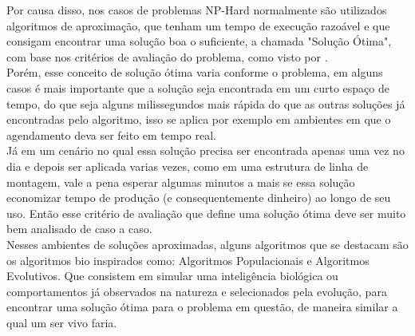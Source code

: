         Por causa disso, nos casos de problemas NP-Hard normalmente são utilizados algoritmos de aproximação, que tenham um tempo de execução razoável e que consigam encontrar uma solução boa o suficiente, a chamada "Solução Ótima",  com base nos critérios de avaliação do problema, como visto por \cite{lawler1993}.\\
        Porém, esse conceito de solução ótima varia conforme o problema, em alguns casos é mais importante que a solução seja encontrada em um curto espaço de tempo, do que seja alguns milissegundos mais rápida do que as outras soluções já encontradas pelo algoritmo, isso se aplica por exemplo em ambientes em que o agendamento deva ser feito em tempo real.\\
        \indent Já em um cenário no qual essa solução precisa ser encontrada apenas uma vez no dia e depois ser aplicada varias vezes, como em uma estrutura de linha de montagem, vale a pena esperar algumas minutos a mais se essa solução economizar tempo de produção (e consequentemente dinheiro) ao longo de seu uso. Então esse critério de avaliação que define uma solução ótima deve ser muito bem analisado de caso a caso.\\
        \indent Nesses ambientes de soluções aproximadas, alguns algoritmos que se destacam são os algoritmos bio inspirados como: Algoritmos Populacionais e Algoritmos Evolutivos. 
        Que consistem em simular uma inteligência biológica ou comportamentos já observados na natureza e selecionados pela evolução, para encontrar uma solução ótima para o problema em questão, de maneira similar a qual um ser vivo faria.\\



